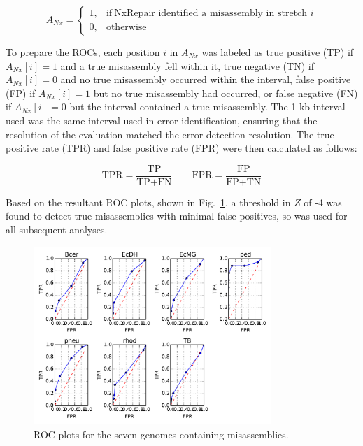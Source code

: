 \begin{equation}
    A_{Nx}=
    \begin{cases}
      1, & \text{if}\ \text{NxRepair identified a misassembly in stretch $i$} \\
      0, & \text{otherwise}
    \end{cases}
  \label{eq:found}
\end{equation}

To prepare the ROCs, each position $i$ in $A_{Nx}$ was labeled as true positive (TP) if $A_{Nx}[i] = 1$ and a true misassembly fell within it, true negative (TN) if $A_{Nx}[i] = 0$ and no true misassembly occurred within the interval, false positive (FP) if $A_{Nx}[i] = 1$ but no true misassembly had occurred, or false negative (FN) if $A_{Nx}[i] = 0$ but the interval contained a true misassembly. The 1 kb interval used was the same interval used in error identification, ensuring that the resolution of the evaluation matched the error detection resolution. The true positive rate (TPR) and false positive rate (FPR) were then calculated as follows:

\begin{equation}
\text{TPR} = \frac{\text{TP}}{\text{TP} + \text{FN}} \qquad \text{FPR} = \frac{\text{FP}}{\text{FP} + \text{TN}}
\label{eq:tpr}
\end{equation}

Based on the resultant ROC plots, shown in Fig.~\ref{fig:ROCs}, a threshold in $Z$ of -4 was found to detect true misassemblies with minimal false positives, so was used for all subsequent analyses. 

\begin{figure}
\centerline{\includegraphics[width=0.8\textwidth]{illumina/allROC.pdf}}
\caption{ROC plots for the seven genomes containing misassemblies.\label{fig:ROCs}}
\end{figure}


